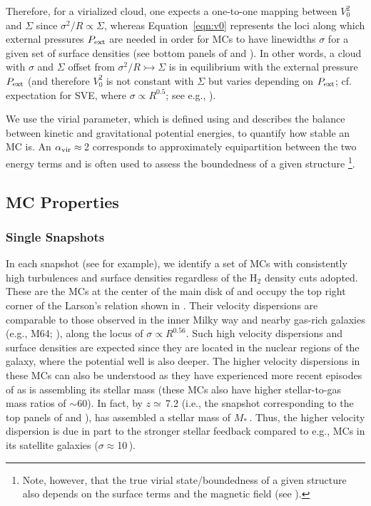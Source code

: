\IfFileExists{emulateapjlegacy.cls}{\documentclass[iop]{emulateapjlegacy}}{\documentclass[iop]{emulateapj}}
\begin{document}
Therefore, for a virialized cloud, one expects a one-to-one mapping between $V_0^2$ and $\Sigma$ since
$\sigma^2/R\propto\Sigma$, whereas
Equation~\ref{eqn:v0} represents the loci along which external pressures $P_{\rm ext}$ are
needed in order for MCs to have linewidths $\sigma$ for a given set of surface densities (see bottom panels of  and 
).
In other words, a cloud with $\sigma$ and $\Sigma$ offset from $\sigma^2/R\rightarrowtail\Sigma$
is in equilibrium with the external pressure $P_{\rm ext}$ (and therefore $V_0^2$ is not constant with $\Sigma$ but
varies depending on $P_{\rm ext}$; cf. expectation for SVE, where
$\sigma\propto R^{0.5}$; see e.g., \citealt{Heyer09a, Hughes10a, Hughes13b, Meidt13a}).

We use the virial parameter, which is defined using  and describes 
the balance between kinetic and gravitational potential energies, 
to quantify how stable an MC is. 
An $\alpha_{\rm vir}\approx$\,2 corresponds to approximately equipartition between the two energy terms 
and is often used to assess the boundedness of a given structure \citep[see e.g., ][]{Kauffmann17b}\footnote{Note, however, that 
the true virial state/boundedness of a given structure also depends on the surface terms and the magnetic field (see ).}.

\subsection{MC Properties}
\subsubsection{Single Snapshots}  \label{sec:singless}

In each snapshot (see  for example),
we identify a set of MCs with consistently high turbulences and surface densities
regardless of the H$_2$ density cuts adopted.
These are the MCs at the center of the main disk of \flower and
occupy the top right corner of the Larson's relation shown in .
Their velocity dispersions are comparable to those observed in the inner Milky way and
nearby gas-rich galaxies (e.g., M64; \citealt{Oka01a, Rosolowsky05a, Heyer09a}),
along the locus of $\sigma\propto R^{0.56}$.
Such high velocity dispersions and surface densities are expected since
they are located in the nuclear regions of the
galaxy, where the potential well is also deeper. The higher velocity dispersions
in these MCs can also be understood as they have experienced more recent episodes
of \SF as \flower is assembling its stellar mass (these MCs also have higher stellar-to-gas mass ratios of $\sim$60).
In fact, by $z\simeq$\,7.2 (i.e., the snapshot corresponding
to the top panels of  and ), \flower has assembled
a stellar mass of $M_*$\,\Msun. Thus, the higher velocity dispersion
is due in part to the stronger stellar feedback compared to e.g., MCs in its satellite galaxies ($\sigma\approx$10\,\kms).
\end{document}
